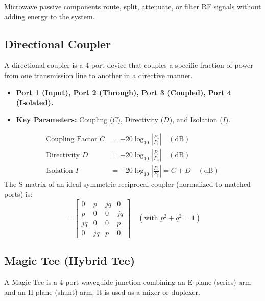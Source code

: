 \documentclass[12pt,a4paper]{article}
\begin{document}
Microwave passive components route, split, attenuate, or filter RF signals without adding energy to the system.

\subsection{Directional Coupler}
A directional coupler is a 4-port device that couples a specific fraction of power from one transmission line to another in a directive manner.
\begin{itemize}[leftmargin=*, itemsep=3pt]
  \item \textbf{Port 1 (Input), Port 2 (Through), Port 3 (Coupled), Port 4 (Isolated).}
  \item \textbf{Key Parameters:} Coupling ($C$), Directivity ($D$), and Isolation ($I$).
\end{itemize}

\begin{tcolorbox}[formulabox, title={\textbf{Directional Coupler Metrics \& S-Matrix}}]
\begin{align}
  \text{Coupling Factor } C &= -20 \log_{10} \left| \frac{P_3}{P_1} \right| \quad (\text{dB}) \\
  \text{Directivity } D &= -20 \log_{10} \left| \frac{P_4}{P_3} \right| \quad (\text{dB}) \\
  \text{Isolation } I &= -20 \log_{10} \left| \frac{P_4}{P_1} \right| = C + D \quad (\text{dB})
\end{align}
The S-matrix of an ideal symmetric reciprocal coupler (normalized to matched ports) is:
\begin{equation}
  [S] = \begin{bmatrix} 0 & p & j q & 0 \\ p & 0 & 0 & j q \\ j q & 0 & 0 & p \\ 0 & j q & p & 0 \end{bmatrix} \quad (\text{with } p^2 + q^2 = 1)
\end{equation}
\end{tcolorbox}

\subsection{Magic Tee (Hybrid Tee)}
A Magic Tee is a 4-port waveguide junction combining an E-plane (series) arm and an H-plane (shunt) arm. It is used as a mixer or duplexer.
\end{document}
